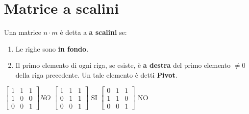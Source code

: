 \documentclass[a4paper, 12pt]{report}
\begin{document}
            \section{Matrice a scalini}
                \paragraph{}Una matrice $n \cdot m$  è detta a \textbf{a scalini} se:
                    \begin{enumerate}
                        \item Le righe sono \textbf{in fondo}.
                        \item Il primo elemento di ogni riga, se esiste, è \textbf{a destra} del primo elemento $\neq 0$ della riga precedente. Un tale elemento è detti \textbf{Pivot}.
                    \end{enumerate}
                        \begin{center}
                        $
                        \begin{bmatrix}
                            1 & 1 & 1\\
                            1 & 0 & 0\\
                            0 & 0 & 1
                        \end{bmatrix}
                        NO
                        $
                        $
                        \begin{bmatrix}
                            1 & 1 & 1\\
                            0 & 1 & 1\\
                            0 & 0 & 1
                        \end{bmatrix}
                        $
                        SI
                        $
                        \begin{bmatrix}
                            0 & 1 & 1\\
                            1 & 1 & 0\\
                            0 & 0 & 1
                        \end{bmatrix}
                        $
                        NO
                    \end{center}
\end{document}
